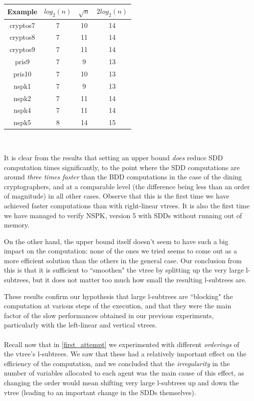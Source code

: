 \documentclass[11pt]{report}
\begin{document}
{\centering
\begin{tabular}{*{3}{c|}c}
Example & $log_2(n)$ & $\sqrt{n}$ & $2log_2(n)$  \\
\hline
cryptos7 & 7 & 10 & 14   \\
cryptos8 & 7 & 11& 14 \\
cryptos9 & 7& 11 & 14  \\
pris9 & 7& 9 & 13   \\
pris10 & 7& 10 & 13   \\
nspk1 & 7& 9 & 13   \\
nspk2 & 7& 11 & 14  \\
nspk4 & 7& 11 & 14   \\
nspk5 & 8& 14 & 15   \\
\end{tabular}
\\\vspace{0.5in}}

\noindent It is clear from the results that setting an upper bound \textit{does} reduce SDD computation times significantly, to the point where the SDD computations are around \textit{three times faster} than the BDD computations in the case of the dining cryptographers, and at a comparable level (the difference being less than an order of magnitude) in all other cases. Observe that this is the first time we have achieved faster computations than with right-linear vtrees. It is also the first time we have managed to verify NSPK, version 5 with SDDs without running out of memory.

On the other hand, the upper bound itself doesn't seem to have such a big impact on the computation: none of the ones we tried seems to come out as a more efficient solution than the others in the general case. Our conclusion from this is that it is sufficient to ``smoothen" the vtree by splitting up the very large l-subtrees, but it does not matter too much how small the resulting l-subtrees are. 

These results confirm our hypothesis that large l-subtrees are ``blocking" the computation at various steps of the execution, and that they were the main factor of the slow performances obtained in our previous experiments, particularly with the left-linear and vertical vtrees.
\\\\
Recall now that in \ref{first_attempt} we experimented with different \textit{orderings }of the vtree's l-subtrees. We saw that these had a relatively important effect on the efficiency of the computation, and we concluded that the \textit{irregularity} in the number of variables allocated to each agent was the main cause of this effect, as changing the order would mean shifting very large l-subtrees up and down the vtree (leading to an important change in the SDDs themselves). 
\end{document}
